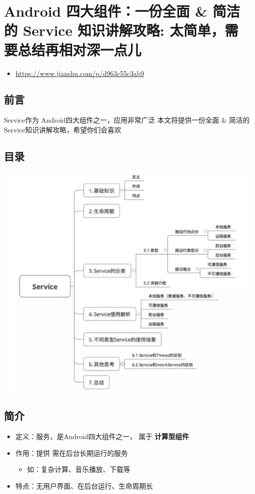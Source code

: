 \documentclass[9pt, b5paper]{article}
\begin{document}
\section{Android 四大组件：一份全面 \& 简洁的 Service 知识讲解攻略: 太简单，需要总结再相对深一点儿}
\label{sec-2}
\begin{itemize}
\item \url{https://www.jianshu.com/p/d963c55c3ab9}
\end{itemize}
\subsection{前言}
\label{sec-2-1}
Service作为 Android四大组件之一，应用非常广泛
本文将提供一份全面 \& 简洁的 Service知识讲解攻略，希望你们会喜欢
\subsection{目录}
\label{sec-2-2}

\includegraphics[width=.9\linewidth]{./pic/service.png}
\subsection{简介}
\label{sec-2-3}
\begin{itemize}
\item 定义：服务，是Android四大组件之一， 属于 \textbf{计算型组件}
\item 作用：提供 需在后台长期运行的服务
\begin{itemize}
\item 如：复杂计算、音乐播放、下载等
\end{itemize}
\item 特点：无用户界面、在后台运行、生命周期长
\end{itemize}
\end{document}
